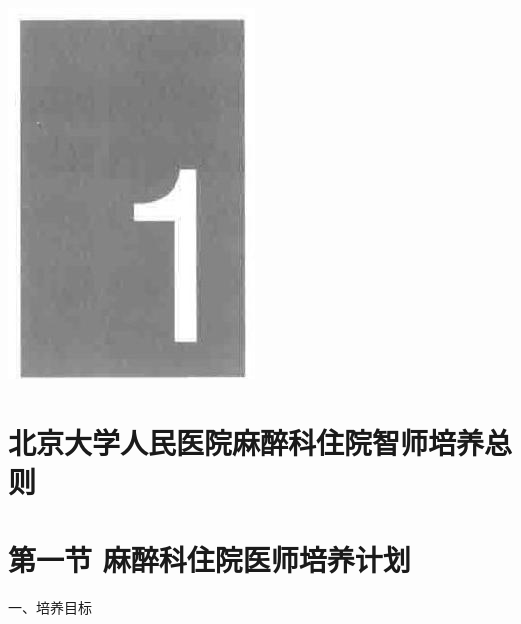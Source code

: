 \documentclass[10pt]{article}
\begin{document}
\begin{center}
\includegraphics[max width=\textwidth]{2024_07_05_645bb794a4d4f32ee0c8g-015}
\end{center}

\section*{北京大学人民医院麻醉科住院智师培养总则}
\section*{第一节 麻醉科住院医师培养计划}
一、培养目标
\end{document}
